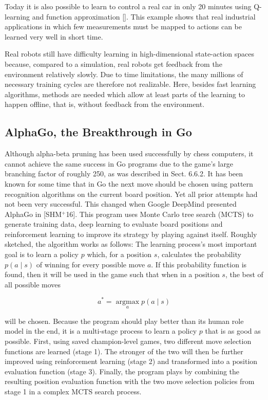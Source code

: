 \documentclass[10pt]{book}
\begin{document}
Today it is also possible to learn to control a real car in only 20 minutes using Q-learning and function approximation [\cite{riedmiller2007drive}]. This example shows that real industrial applications in which few measurements must be mapped to actions can be learned very well in short time.

Real robots still have difficulty learning in high-dimensional state-action spaces because, compared to a simulation, real robots get feedback from the environment relatively slowly. Due to time limitations, the many millions of necessary training cycles are therefore not realizable. Here, besides fast learning algorithms, methods are needed which allow at least parts of the learning to happen offline, that is, without feedback from the environment.

\subsection{AlphaGo, the Breakthrough in Go}
Although alpha-beta pruning has been used successfully by chess computers, it cannot achieve the same success in Go programs due to the game's large branching factor of roughly 250, as was described in Sect. 6.6.2. It has been known for some time that in Go the next move should be chosen using pattern recognition algorithms on the current board position. Yet all prior attempts had not been very successful. This changed when Google DeepMind presented AlphaGo in [SHM${}^{+}$16]. This program uses Monte Carlo tree search (MCTS) to generate training data, deep learning to evaluate board positions and reinforcement learning to improve its strategy by playing against itself. Roughly sketched, the algorithm works as follows:
The learning process's most important goal is to learn a policy $p$ which, for a position $s$, calculates the probability $p(a \mid s)$ of winning for every possible move $a$. If this probability function is found, then it will be used in the game such that when in a position $s$, the best of all possible moves

$$
a^{*}=\underset{a}{\operatorname{argmax}} p(a \mid s)
$$

will be chosen. Because the program should play better than its human role model in the end, it is a multi-stage process to learn a policy $p$ that is as good as possible. First, using saved champion-level games, two different move selection functions are learned (stage 1). The stronger of the two will then be further improved using reinforcement learning (stage 2) and transformed into a position evaluation function (stage 3). Finally, the program plays by combining the resulting position evaluation function with the two move selection policies from stage 1 in a complex MCTS search process.
\end{document}
